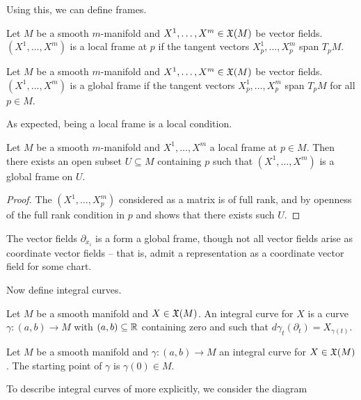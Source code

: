Using this, we can define frames. 
\begin{definition}\label{def: local frame}
    Let $M$ be a smooth $m$-manifold and $X^{1},\dots,X^{m}\in\mathfrak{X}(M)$ be vector fields. $(X^{1},\dots,X^{m})$ is a local frame at $p$ if the tangent vectors $X^{1}_{p},\dots,X^{m}_{p}$ span $T_{p}M$. 
\end{definition}
\begin{definition}\label{def: global frame}
    Let $M$ be a smooth $m$-manifold and $X^{1},\dots,X^{m}\in\mathfrak{X}(M)$ be vector fields. $(X^{1},\dots,X^{m})$ is a global frame if the tangent vectors $X^{1}_{p},\dots,X^{m}_{p}$ span $T_{p}M$ for all $p\in M$. 
\end{definition}
As expected, being a local frame is a local condition. 
\begin{lemma}\label{lem: local frame is local}
    Let $M$ be a smooth $m$-manifold and $X^{1},\dots,X^{m}$ a local frame at $p\in M$. Then there exists an open subset $U\subseteq M$ containing $p$ such that $(X^{1},\dots,X^{m})$ is a global frame on $U$. 
\end{lemma}
\begin{proof}
    The $(X^{1},\dots,X^{m}_{p})$ considered as a matrix is of full rank, and by openness of the full rank condition in $p$ and  shows that there exists such $U$. 
\end{proof}
\begin{example}
    The vector fields $\partial_{x_{i}}$ is a form a global frame, though not all vector fields arise as coordinate vector fields -- that is, admit a representation as a coordinate vector field for some chart. 
\end{example}
Now define integral curves. 
\begin{definition}\label{def: integral curve}
    Let $M$ be a smooth manifold and $X\in\mathfrak{X}(M)$. An integral curve for $X$ is a curve $\gamma:(a,b)\to M$ with $(a,b)\subseteq\mathbb{R}$ containing zero and such that $d\gamma_{t}(\partial_{t})=X_{\gamma(t)}$.  
\end{definition}
\begin{definition}\label{def: starting point}
    Let $M$ be a smooth manifold and $\gamma:(a,b)\to M$ an integral curve for $X\in\mathfrak{X}(M)$. The starting point of $\gamma$ is $\gamma(0)\in M$. 
\end{definition}
To describe integral curves of  more explicitly, we consider the diagram 
